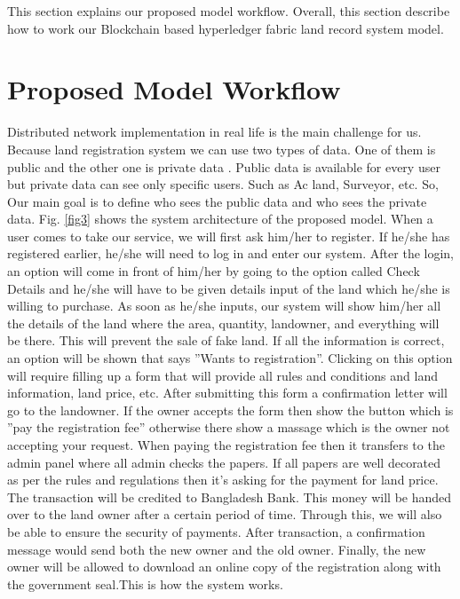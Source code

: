 \documentclass[12pt]{ucthesis}
\begin{document}
    This section explains our proposed model workflow. Overall, this section describe how to work our Blockchain based hyperledger fabric land record system model. 

 

\section{Proposed Model Workflow}
    
    Distributed network implementation in real life is the main challenge for us. Because land registration system we can use two types of data. One of them is public and the other one
is private data \cite{rf21}. Public data is available for every user but private data can see only specific users. Such as Ac land, Surveyor, etc. So, Our main goal is to define who sees the
public data and who sees the private data. Fig. \ref{fig3} shows the system architecture of the proposed model. When a user comes to take our service, we will first ask him/her to register. If he/she has registered earlier, he/she will need to log in and enter our system. After the login, an option will come in front of him/her by going to the option called Check Details and he/she will have to be given details input of the land which he/she is willing to purchase. As soon as he/she inputs, our system will show him/her all the details of the land where the area, quantity, landowner, and everything will be there. This will prevent the sale of fake land. If all the information is correct, an option will be shown
that says ”Wants to registration”. Clicking on this option will require filling up a form that will provide all rules and conditions and land information, land price, etc. After submitting this form a confirmation letter will go to the landowner. If the owner accepts the form then show the button which is ”pay the registration fee” otherwise there show a massage which is the owner not accepting your request. When paying the registration fee then it transfers to the admin panel where all admin checks the papers. If all papers are well decorated as per the rules and regulations then it’s asking for the payment for land price. The transaction will be credited to Bangladesh Bank. This money will be handed over to the land owner after a certain period of time. Through this, we will also be able to ensure the security of payments. After transaction, a confirmation message would send both the new owner and the old owner. Finally, the new owner will be allowed to download an online copy of the registration along with the government seal.This is how the system works.
\end{document}
